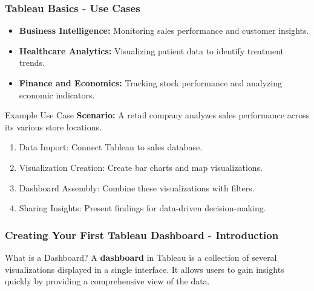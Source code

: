 \documentclass[aspectratio=169]{beamer}
\begin{document}
\begin{frame}[fragile]
    \frametitle{Tableau Basics - Use Cases}
    \begin{itemize}
        \item \textbf{Business Intelligence:} Monitoring sales performance and customer insights.
        \item \textbf{Healthcare Analytics:} Visualizing patient data to identify treatment trends.
        \item \textbf{Finance and Economics:} Tracking stock performance and analyzing economic indicators.
    \end{itemize}

    \begin{block}{Example Use Case}
        \textbf{Scenario:} A retail company analyzes sales performance across its various store locations.
        \begin{enumerate}
            \item Data Import: Connect Tableau to sales database.
            \item Visualization Creation: Create bar charts and map visualizations.
            \item Dashboard Assembly: Combine these visualizations with filters.
            \item Sharing Insights: Present findings for data-driven decision-making.
        \end{enumerate}
    \end{block}
\end{frame}

\begin{frame}[fragile]
    \frametitle{Creating Your First Tableau Dashboard - Introduction}
    \begin{block}{What is a Dashboard?}
        A \textbf{dashboard} in Tableau is a collection of several visualizations displayed in a single interface. It allows users to gain insights quickly by providing a comprehensive view of the data.
    \end{block}
\end{frame}
\end{document}

